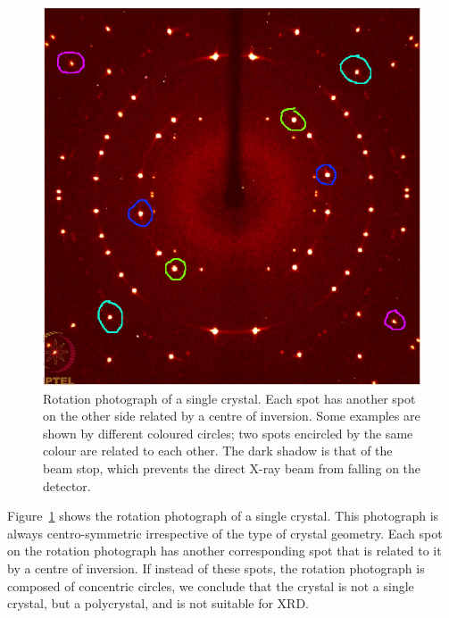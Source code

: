 	\begin{figure}
	\centering
	\includegraphics[scale=0.3]{rotation_photograph_mod.png}
	\caption{\label{fig:rotation_photo}Rotation photograph of a single crystal. Each spot has another spot on the other side related by a centre of inversion. Some examples are shown by different coloured circles; two spots encircled by the same colour are related to each other. The dark shadow is that of the beam stop, which prevents the direct X-ray beam from falling on the detector.}
	\end{figure}
	
	Figure~\ref{fig:rotation_photo} shows the rotation photograph of a single crystal. This photograph is always centro-symmetric irrespective of the type of crystal geometry. Each spot on the rotation photograph has another corresponding spot that is related to it by a centre of inversion. If instead of these spots, the rotation photograph is composed of concentric circles, we conclude that the crystal is not a single crystal, but a polycrystal, and is not suitable for XRD.